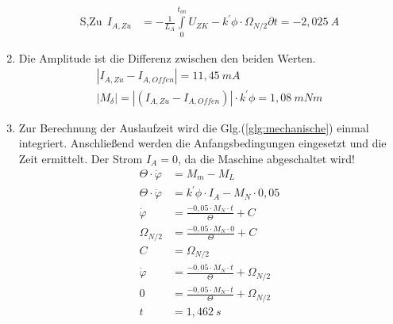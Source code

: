 \begin{solution}
\begin{enumerate}
\begin{align}
\text{S,Zu}~~ I_{A,Zu}&=- \frac{1}{L_A}\int \limits_{0}^{t_{on}} U_{ZK} -k^{'} \phi \cdot \Omega_{N/2} \partial t=-2,025~A
\end{align}
\item Die Amplitude ist die Differenz zwischen den beiden Werten.
\begin{align}
|I_{A,Zu}- I_{A,Offen}|=11,45~mA\\
|M_\delta| = |(I_{A,Zu}- I_{A,Offen})| \cdot k^{'} \phi = 1,08~mNm
\end{align}
\item Zur Berechnung der Auslaufzeit wird die Glg.(\ref{glg:mechanische}) einmal integriert. Anschließend werden die Anfangsbedingungen eingesetzt und die Zeit ermittelt. Der Strom $I_A =0$, da die Maschine abgeschaltet wird!
\begin{align}
\Theta \cdot \ddot{\varphi} &= M_m - M_L\\
\Theta \cdot \ddot{\varphi} &= k^{'} \phi \cdot I_A - M_N \cdot 0,05\\
\dot{\varphi} &= \frac{-0,05 \cdot M_N \cdot t}{\Theta}+ C\\
\Omega_{N/2} &= \frac{-0,05 \cdot M_N \cdot 0}{\Theta}+ C\\
C&= \Omega_{N/2}\\
\dot{\varphi} &= \frac{-0,05 \cdot M_N \cdot t}{\Theta}+ \Omega_{N/2}\\
0 &= \frac{-0,05 \cdot M_N \cdot t}{\Theta}+ \Omega_{N/2}\\
t &= 1,462~s
\end{align}
\end{enumerate}
\end{solution}